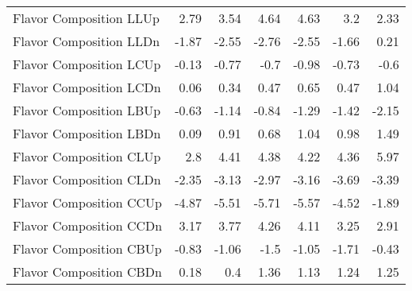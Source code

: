 \begin{table}[htbp]
{\begin{tabular}{lrrrrrr}
Flavor Composition LLUp                               & 2.79               & 3.54               & 4.64              & 4.63              & 3.2               & 2.33              \\
Flavor Composition LLDn                               & -1.87              & -2.55              & -2.76             & -2.55             & -1.66             & 0.21              \\
Flavor Composition LCUp                               & -0.13              & -0.77              & -0.7              & -0.98             & -0.73             & -0.6              \\
Flavor Composition LCDn                               & 0.06               & 0.34               & 0.47              & 0.65              & 0.47              & 1.04              \\
Flavor Composition LBUp                               & -0.63              & -1.14              & -0.84             & -1.29             & -1.42             & -2.15             \\
Flavor Composition LBDn                               & 0.09               & 0.91               & 0.68              & 1.04              & 0.98              & 1.49              \\
Flavor Composition CLUp                               & 2.8                & 4.41               & 4.38              & 4.22              & 4.36              & 5.97              \\
Flavor Composition CLDn                               & -2.35              & -3.13              & -2.97             & -3.16             & -3.69             & -3.39             \\
Flavor Composition CCUp                               & -4.87              & -5.51              & -5.71             & -5.57             & -4.52             & -1.89             \\
Flavor Composition CCDn                               & 3.17               & 3.77               & 4.26              & 4.11              & 3.25              & 2.91              \\
Flavor Composition CBUp                               & -0.83              & -1.06              & -1.5              & -1.05             & -1.71             & -0.43             \\
Flavor Composition CBDn                               & 0.18               & 0.4                & 1.36              & 1.13              & 1.24              & 1.25              \\

\end{tabular}}
\end{table}
